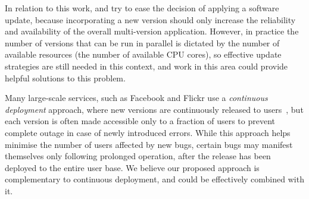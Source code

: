 
In relation to this work, \mx and \varan try to ease the decision of applying a
software update, because incorporating a new version should only increase the
reliability and availability of the overall multi-version application.
However, in practice the number of versions that can be run in parallel is
dictated by the number of available resources (\eg the number of available CPU
cores), so effective update strategies are still needed in this context, and
work in this area could provide helpful solutions to this problem.


Many large-scale services, such as Facebook and Flickr use a {\it continuous
deployment} approach, where new versions are continuously released to
users~\cite{johnson2009,flickr}, but each version is often made accessible only
to a fraction of users to prevent complete outage in case of newly introduced
errors.  While this approach helps minimise the number of users affected by new
bugs, certain bugs may manifest themselves only following prolonged operation,
after the release has been deployed to the entire user base.  We believe our
proposed approach is complementary to continuous deployment, and could be
effectively combined with it.
